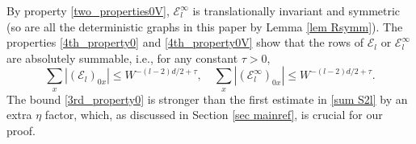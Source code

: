 \documentclass{article}
\newcommand{\1}{\mathds{1}}
\numberwithin{equation}{section}
\newcommand{\be}{\begin{equation}}
\newcommand{\ee}{\end{equation}}
\renewcommand{\cal}{\mathcal}
\renewcommand{\leq}{\leqslant}
\renewcommand{\le}{\leq}
\newcommand{\dashed}{\text{diffusive}}
\newcommand{\self}{\text{self-energy}}
\newcommand{\selfs}{\text{self-energies}}
\theoremstyle{plain} %
\theoremstyle{remark}
\newcommand{\cor}{\color{red}}
\newcommand{\cob}{\color{purple}}
\newcommand{\Sele}{{\mathcal E}}
\newcommand{\Selek}{{\mathcal E}}
\newcommand{\Seleinf}{{\mathcal E}^{\infty}}
\newcommand{\hty}[1]{{\cor (ht: #1) }}
\begin{document}

By property \eqref{two_properties0V}, $\Seleinf_l$ is translationally invariant and symmetric (so are all the deterministic graphs in this paper by Lemma \ref{lem Rsymm}). 
The properties \eqref{4th_property0} and \eqref{4th_property0V} show that the rows of $\Selek_{l}$ or $\Seleinf_{l}$ are absolutely summable, i.e.,  
 for any constant $\tau>0$,
 \be\label{sum S2l}\sum_{x}\left| (\Selek_{l})_{0x}  \right| \le W^{-(l-2)d/2 + \tau},\quad \sum_{x}\left| (\Selek_{l}^\infty)_{0x} \right| \le W^{-(l-2)d/2 + \tau} .
 \ee
The bound \eqref{3rd_property0} is stronger than the first estimate in \eqref{sum S2l} by an extra $\eta$ factor, which, as discussed in Section \ref{sec mainref}, is crucial for our proof.  %
\end{document}
